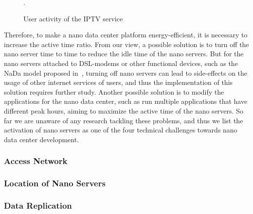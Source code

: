 \begin{figure}[h]
	\fontsize{12}{12} \selectfont
	\centerline{}
	\caption{User activity of the IPTV service~\cite{DBLP:conf/conext/ValanciusLMDR09}}.
	\label{fig:iptv}
	\normalsize
\end{figure}

Therefore, to make a nano data center platform energy-efficient,
it is necessary to increase the active time ratio.
From our view,
a possible solution is to turn off the nano server time to time to reduce the idle time of the nano servers.
But for the nano servers attached to DSL-modems or other functional devices,
such as the NaDa model proposed in~\cite{DBLP:conf/conext/ValanciusLMDR09},
turning off nano servers can lead to side-effects on the usage of other internet services of users,
and thus the implementation of this solution requires further study.
Another possible solution is to modify the applications for the nano data center,
such as run multiple applications that have different peak hours,
aiming to maximize the active time of the nano servers.
So far we are unaware of any research tackling these problems,
and thus we list the activation of nano servers as one of the four technical challenges towards nano data center development.

\subsubsection{Access Network}

\subsubsection{Location of Nano Servers}

\subsubsection{Data Replication}
